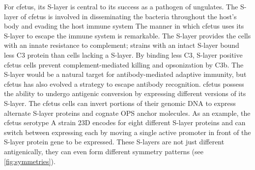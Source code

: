  For \acl{cfetus}, its \ac{S-layer} is central to its success as a pathogen of ungulates. The \ac{S-layer} of \ac{cfetus} is involved in disseminating the bacteria throughout the host's body and evading the host immune system The manner in which \ac{cfetus} uses its \ac{S-layer} to escape the immune system is remarkable. The \ac{S-layer} provides the cells with an innate resistance to complement; strains with an intact \ac{S-layer} bound less C3 protein than cells lacking a \ac{S-layer}. By binding less C3, \ac{S-layer} positive \ac{cfetus} cells prevent complement-mediated killing and opsonization by C3b. The \ac{S-layer} would be a natural target for antibody-mediated adaptive immunity, but \ac{cfetus} has also evolved a strategy to escape antibody recognition. \ac{cfetus} possess the ability to undergo antigenic conversion by expressing different versions of its \ac{S-layer}. The \ac{cfetus} cells can invert portions of their genomic DNA to express alternate \ac{S-layer} proteins and cognate \ac{OPS} anchor molecules. As an example, the \ac{cfetus} serotype A strain 23D encodes for eight different \ac{S-layer} proteins and can switch between expressing each by moving a single active promoter in front of the \ac{S-layer} protein gene to be expressed. These \acp{S-layer} are not just different antigenically, they can even form different symmetry patterns (see \cref{fig:symmetries}).

